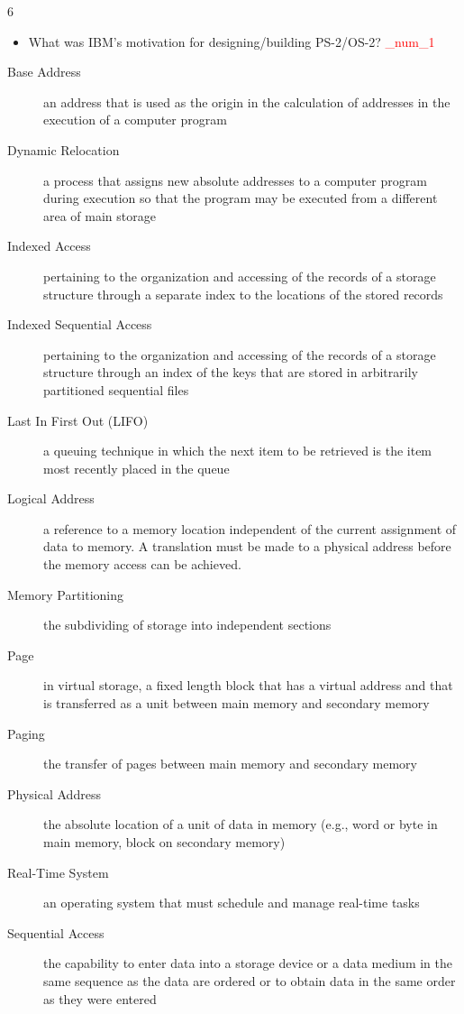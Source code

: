\documentclass[9pt,landscape]{memoir}
\newcommand{\answer}[1]{\textcolor{red}{_num_1}}
\begin{document}
\begin{multicols}{6}
\begin{itemize}
    \item What was IBM's motivation for designing/building PS-2/OS-2? \answer{IBM planned to steal the market from Gates with a brand new OS called OS/2.}
\end{itemize}

\begin{description}
    \item[Base Address] an address that is used as the origin in the calculation of addresses in the execution of a computer program
    \item[Dynamic Relocation] a process that assigns new absolute addresses to a computer program during execution so that the program may be executed from a different area of main storage
    \item[Indexed Access] pertaining to the organization and accessing of the records of a storage structure through a separate index to the locations of the stored records
    \item[Indexed Sequential Access] pertaining to the organization and accessing of the records of a storage structure through an index of the keys that are stored in arbitrarily partitioned sequential files
    \item[Last In First Out (LIFO)] a queuing technique in which the next item to be retrieved is the item most recently placed in the queue
    \item[Logical Address] a reference to a memory location independent of the current assignment of data to memory.  A translation must be made to a physical address before the memory access can be achieved.
    \item[Memory Partitioning] the subdividing of storage into independent sections
    \item[Page] in virtual storage, a fixed length block that has a virtual address and that is transferred as a unit between main memory and secondary memory
    \item[Paging] the transfer of pages between main memory and secondary memory
    \item[Physical Address] the absolute location of a unit of data in memory (e.g., word or byte in main memory, block on secondary memory)
    \item[Real-Time System] an operating system that must schedule and manage real-time tasks
    \item[Sequential Access] the capability to enter data into a storage device or a data medium in the same sequence as the data are ordered or to obtain data in the same order as they were entered

\end{description}
\end{multicols}
\end{document}

